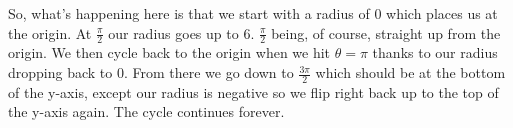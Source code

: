 \begin{solution}
    
    So, what's happening here is that we start with a radius of 0 which places us at the origin. At $\frac{\pi}{2}$ our radius goes up to 6. $\frac{\pi}{2}$ being, of course, straight up from the origin. We then cycle back to the origin when we hit $\theta = \pi$ thanks to our radius dropping back to 0. From there we go down to $\frac{3\pi}{2}$ which should be at the bottom of the y-axis, except our radius is negative so we flip right back up to the top of the y-axis again. The cycle continues forever. \medskip
\end{solution}